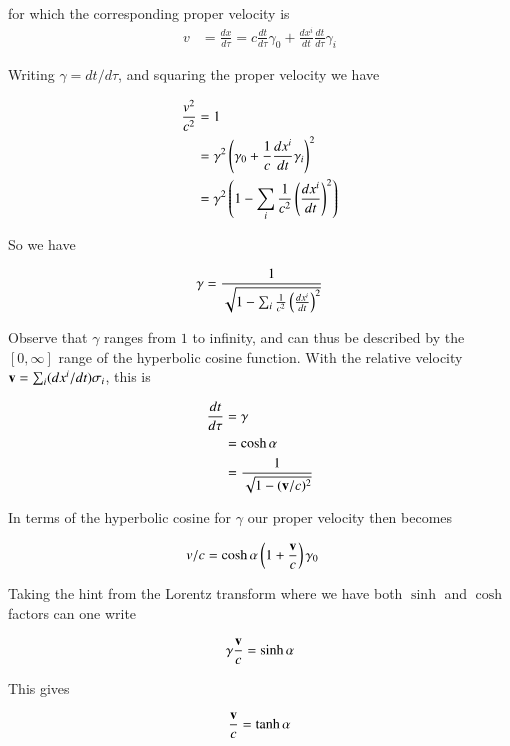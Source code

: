 for which the corresponding proper velocity is
\begin{align*}
v &= \frac{dx}{d\tau} = c \frac{dt}{d\tau} \gamma_0 + \frac{dx^i}{dt} \frac{dt}{d\tau} \gamma_i
\end{align*}

Writing $\gamma = dt/d\tau$, and squaring the proper velocity we have

\begin{align*}
\frac{v^2}{c^2}
&= 1 \\
&= \gamma^2 \left(\gamma_0 + \frac{1}{c}\frac{dx^i}{dt} \gamma_i\right)^2 \\
&= \gamma^2 \left(1 - \sum_i \frac{1}{c^2} \left(\frac{dx^i}{dt}\right)^2 \right) \\
\end{align*}

So we have 

\begin{align*}
\gamma 
&= \frac{1}{\sqrt{1 - \sum_i \frac{1}{c^2} \left(\frac{dx^i}{dt}\right)^2 }} \\
\end{align*}

Observe that $\gamma$ ranges from $1$ to infinity, and can thus be described by the $[0,\infty]$ range of the hyperbolic cosine function.  With
the relative velocity $\mathbf{v} = \sum_i (dx^i/dt) \sigma_i$, this is

\begin{align*}
\frac{dt}{d\tau} &= \gamma  \\
&= \cosh\alpha \\
&= \frac{1}{\sqrt{1 - (\mathbf{v}/c)^2}}
\end{align*}

In terms of the hyperbolic cosine for $\gamma$ our proper velocity then becomes

\begin{align*}
v/c &= \cosh\alpha \left(1 + \frac{\mathbf{v}}{c} \right) \gamma_0
\end{align*}

Taking the hint from the Lorentz transform where we have both $\sinh$ and $\cosh$ factors can one write

\begin{align*}
\gamma \frac{\mathbf{v}}{c} = \sinh\alpha
\end{align*}

This gives

\begin{align*}
\frac{\mathbf{v}}{c} = \tanh\alpha
\end{align*}

